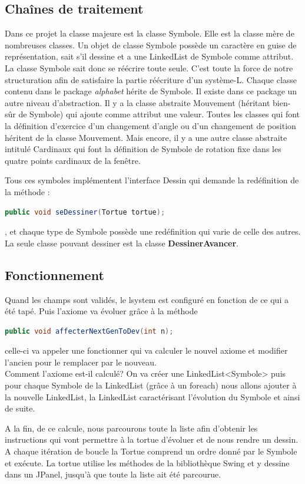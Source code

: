 \documentclass[12pt]{article}
\begin{document}
\subsection{Chaînes de traitement}
Dans ce projet la classe majeure est la classe Symbole. Elle est la classe mère de nombreuses classes.
Un objet de classe Symbole possède un caractère en guise de représentation, sait s'il dessine et a une LinkedList de Symbole comme attribut. La classe Symbole sait donc se réécrire toute seule. C'est toute la force de notre structuration afin de satisfaire la partie réécriture d'un système-L.
Chaque classe contenu dans le package \textit{alphabet} hérite de Symbole.
Il existe dans ce package un autre niveau d'abstraction. Il y a la classe abstraite Mouvement (héritant bien-sûr de Symbole) qui ajoute comme attribut une valeur. Toutes les classes qui font la définition d'exercice d'un changement d'angle ou d'un changement de position héritent de la classe Mouvement.
Mais encore, il y a une autre classe abstraite intitulé Cardinaux qui font la définition de Symbole de rotation fixe dans les quatre points cardinaux de la fenêtre.

Tous ces symboles implémentent l'interface Dessin qui demande la redéfinition de la méthode :
\begin{lstlisting}[language=Java]
public void seDessiner(Tortue tortue);
\end{lstlisting}
, et chaque type de Symbole possède une redéfinition qui varie de celle des autres.
La seule classe pouvant dessiner est la classe \textbf{DessinerAvancer}.

\subsection{Fonctionnement}
Quand les champs sont validés, le lsystem est configuré en fonction de ce qui a été tapé.
Puis l'axiome va évoluer grâce à la méthode \begin{lstlisting}[language=Java]
public void affecterNextGenToDev(int n);
\end{lstlisting}
celle-ci va appeler une fonctionner qui va calculer le nouvel axiome et modifier l'ancien pour le remplacer par le nouveau.
\\
Comment l'axiome est-il calculé?
On va créer une LinkedList<Symbole> puis pour chaque Symbole de la LinkedList (grâce à un foreach) nous allons ajouter à la nouvelle LinkedList, la LinkedList caractérisant l'évolution du Symbole et ainsi de suite.

A la fin, de ce calcule, nous parcourons toute la liste afin d'obtenir les instructions qui vont permettre à la tortue d'évoluer et de nous rendre un dessin.
A chaque itération de boucle la Tortue comprend un ordre donné par le Symbole et exécute. La tortue utilise les méthodes de la bibliothèque Swing et y dessine dans un JPanel, jusqu'à que toute la liste ait été parcourue.
\end{document}

